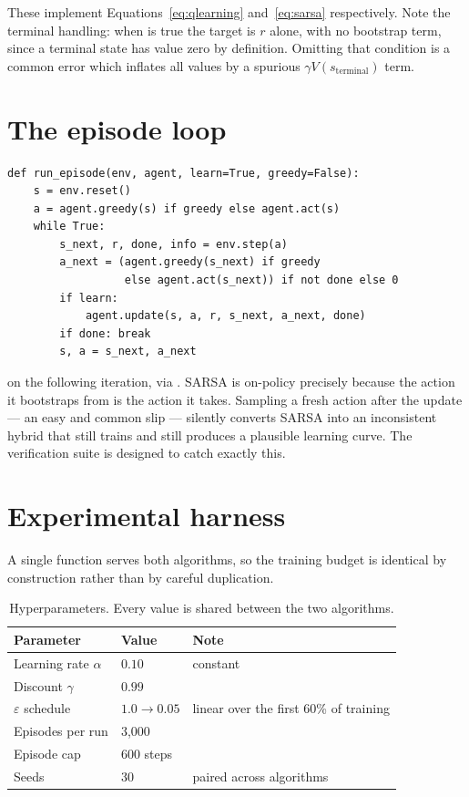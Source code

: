 These implement Equations~\ref{eq:qlearning} and~\ref{eq:sarsa} respectively. Note the terminal
handling: when  is true the target is $r$ alone, with no bootstrap term, since a
terminal state has value zero by definition. Omitting that condition is a common error which
inflates all values by a spurious $\gamma V(s_{\text{terminal}})$ term.

\section{The episode loop}

{\small
\begin{verbatim}
def run_episode(env, agent, learn=True, greedy=False):
    s = env.reset()
    a = agent.greedy(s) if greedy else agent.act(s)
    while True:
        s_next, r, done, info = env.step(a)
        a_next = (agent.greedy(s_next) if greedy
                  else agent.act(s_next)) if not done else 0
        if learn:
            agent.update(s, a, r, s_next, a_next, done)
        if done: break
        s, a = s_next, a_next
\end{verbatim}}

 on the following iteration, via . SARSA is
on-policy precisely because the action it bootstraps from is the action it takes. Sampling a fresh
action after the update --- an easy and common slip --- silently converts SARSA into an
inconsistent hybrid that still trains and still produces a plausible learning curve. The
verification suite is designed to catch exactly this.

\section{Experimental harness}

A single  function serves both algorithms, so the training budget is identical by
construction rather than by careful duplication.

\begin{table}[ht]
\centering
\caption[Hyperparameters]{Hyperparameters. Every value is shared between the two algorithms.}
\label{tab:hyper}
\begin{tabular}{lll}
\toprule
\textbf{Parameter} & \textbf{Value} & \textbf{Note} \\
\midrule
Learning rate $\alpha$      & $0.10$ & constant \\
Discount $\gamma$           & $0.99$ & \\
$\varepsilon$ schedule      & $1.0 \rightarrow 0.05$ & linear over the first 60\% of training \\
Episodes per run            & 3{,}000 & \\
Episode cap                 & 600 steps & \\
Seeds                       & 30 & paired across algorithms \\
\bottomrule
\end{tabular}
\end{table}

